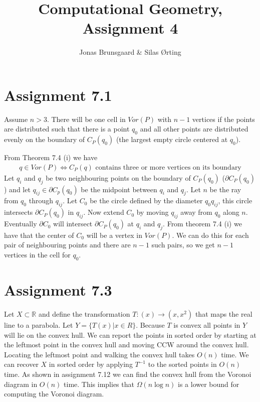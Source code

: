 \documentclass[10pt,a4paper,final,oneside,openany,article,oldfontcommands]{memoir}
\title{Computational Geometry, Assignment 4}
\author{
    Jonas Brunsgaard \& Silas Ørting
}
\begin{document}
\maketitle


\chapter*{Assignment 7.1}
Assume $n > 3$. There will be one cell in $Vor(P)$ with $n-1$ vertices if the points are distributed such that there is a point $q_0$ and all other points are distributed evenly on the boundary of $C_P(q_0)$ (the largest empty circle centered at $q_0$).

From Theorem 7.4 (i) we have
\begin{align*}
  q \in Vor(P) \iff C_P(q) \text{ contains three or more vertices on its boundary}
\end{align*}
Let $q_i$ and $q_j$ be two neighbouring points on the boundary of $C_P(q_0)$ ($\partial C_P(q_0)$) and let $q_{ij} \in \partial C_p(q_0)$ be the midpoint between $q_i$ and $q_j$. Let $n$ be the ray from $q_0$ through $q_{ij}$. Let $C_0$ be the circle defined by the diameter $q_0q_{ij}$, this circle intersects $\partial C_P(q_0)$ in $q_{ij}$. Now extend $C_0$ by moving $q_{ij}$ away from $q_0$ along $n$. Eventually $\partial C_0$ will intersect $\partial C_P(q_0)$ at $q_i$ and $q_j$. From theorem 7.4 (i) we have that the center of $C_0$ will be a vertex in $Vor(P)$. We can do this for each pair of neighbouring points and there are $n-1$ such pairs, so we get $n-1$ vertices in the cell for $q_0$.

\chapter*{Assignment 7.3}
Let $X \subset \mathbb{R}$ and define the transformation $T : (x) \to (x, x^2)$ that maps the real line to a parabola. Let $Y = \{T(x) | x \in R\}$. Because $T$ is convex all points in $Y$ will lie on the convex hull. We can report the points in sorted order by starting at the leftmost point in the convex hull and moving CCW around the convex hull. Locating the leftmost point and walking the convex hull takes $O(n)$ time. We can recover $X$ in sorted order by applying $T^{-1}$ to the sorted points in $O(n)$ time. As shown in assignment 7.12 we can find the convex hull from the Voronoi diagram in $O(n)$ time. This implies that $\Omega(n \log n)$ is a lower bound for computing the Voronoi diagram.
\end{document}
